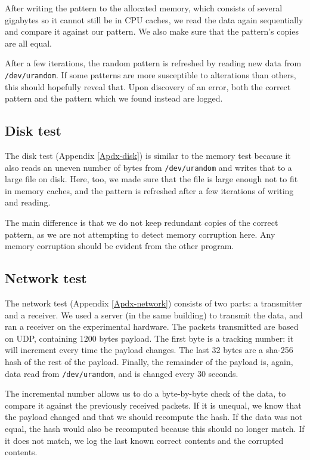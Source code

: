 \documentclass[conference]{IEEEtran}
\begin{document}
After writing the pattern to the allocated memory, which consists of several
gigabytes so it cannot still be in CPU caches, we read the data again
sequentially and compare it against our pattern. We also make sure that the
pattern's copies are all equal.

After a few iterations, the random pattern is refreshed by reading new data
from \texttt{/dev/urandom}. If some patterns are more susceptible to
alterations than others, this should hopefully reveal that. Upon discovery of
an error, both the correct pattern and the pattern which we found instead are
logged.

\subsection{Disk test}

The disk test (Appendix \ref{Apdx-disk}) is similar to the memory test because
it also reads an uneven number of bytes from \texttt{/dev/urandom} and writes
that to a large file on disk. Here, too, we made sure that the file is large
enough not to fit in memory caches, and the pattern is refreshed after a few
iterations of writing and reading.

The main difference is that we do not keep redundant copies of the correct
pattern, as we are not attempting to detect memory corruption here. Any memory
corruption should be evident from the other program.

\subsection{Network test}

The network test (Appendix \ref{Apdx-network}) consists of two parts: a
transmitter and a receiver. We used a server (in the same building) to transmit
the data, and ran a receiver on the experimental hardware. The packets
transmitted are based on UDP, containing 1200 bytes payload. The first byte is
a tracking number: it will increment every time the payload changes. The last
32 bytes are a sha-256 hash of the rest of the payload. Finally, the remainder
of the payload is, again, data read from \texttt{/dev/urandom}, and is changed
every 30 seconds.

The incremental number allows us to do a byte-by-byte check of the data, to
compare it against the previously received packets. If it is unequal, we know
that the payload changed and that we should recompute the hash. If the data was
not equal, the hash would also be recomputed because this should no longer
match. If it does not match, we log the last known correct contents and the
corrupted contents.
\end{document}
